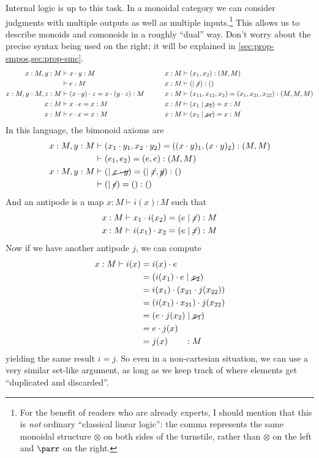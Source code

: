 \documentclass{book}
\let\types\vdash
\let\tensor\otimes
\begin{document}
Internal logic is up to this task.
In a monoidal category we can consider judgments with multiple outputs as well as multiple inputs.\footnote{For the benefit of readers who are already experts, I should mention that this is \emph{not} ordinary ``classical linear logic'': the comma represents the same monoidal structure $\tensor$ on both sides of the turnstile, rather than $\tensor$ on the left and $\parr$ on the right.}
This allows us to describe monoids and comonoids in a roughly ``dual'' way.
Don't worry about the precise syntax being used on the right; it will be explained in \cref{sec:prop-smpos,sec:prop-smc}.
\begin{alignat*}{2}
  x:M, y:M &\types x\cdot y:M &\qquad x:M &\types (x_1,x_2):(M,M)\\
  &\types e:M &\qquad x:M &\types (\mid\cancel{x}):()\\
  x:M,y:M,z:M &\types (x\cdot y)\cdot z = x\cdot (y\cdot z) :M &\qquad x:M &\types (x_{11},x_{12},x_2)=(x_1,x_{21},x_{22}):(M,M,M)\\
  x:M &\types x\cdot e=x:M &\qquad x:M &\types (x_1\mid\cancel{x_2}) = x:M\\
  x:M &\types e\cdot x=x:M &\qquad x:M &\types (x_2\mid\cancel{x_1}) = x:M
\end{alignat*}
In this language, the bimonoid axioms are
\begin{align*}
  x:M,y:M &\types (x_1\cdot y_1,x_2\cdot y_2) = ((x\cdot y)_1,(x\cdot y)_2) :(M,M)\\
          &\types (e_1,e_2)=(e,e):(M,M)\\
  x:M,y:M &\types (\mid\cancel{x\cdot y}) = (\mid\cancel{x},\cancel{y}) : ()\\
  &\types (\mid\cancel{e})=():()
\end{align*}
And an antipode is a map $x:M \types i(x):M$ such that
\begin{align*}
  x:M &\types x_1\cdot i(x_2) = (e\mid\cancel{x}) :M\\
  x:M &\types i(x_1)\cdot x_2 = (e\mid\cancel{x}) :M
\end{align*}
Now if we have another antipode $j$, we can compute
\begin{align*}
  x:M \types i(x)
  &= i(x)\cdot e\\
  &= (i(x_1)\cdot e\mid\cancel{x_2})\\
  &= i(x_1)\cdot (x_{21} \cdot j(x_{22}))\\
  &= (i(x_1)\cdot x_{21}) \cdot j(x_{22})\\
  &= (e \cdot j(x_{2})\mid\cancel{x_1})\\
  &= e\cdot j(x)\\
  &= j(x) \qquad :M
\end{align*}
yielding the same result $i=j$.
So even in a non-cartesian situation, we can use a very similar set-like argument, as long as we keep track of where elements get ``duplicated and discarded''.
\end{document}
